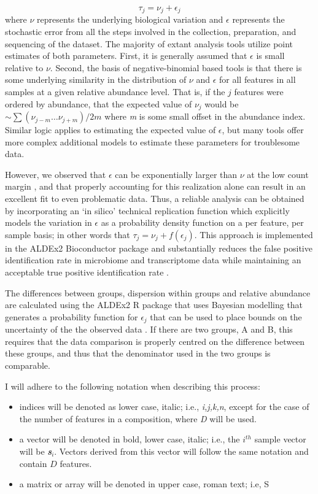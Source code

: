 \documentclass{bmcart}
\begin{document}
\begin{equation}
    \tau_{j} = \nu_j + \epsilon_j
\label{eq:dispersion}
\end{equation} 
where $\nu$ represents the underlying biological variation and $\epsilon$ represents the stochastic error  from all the steps involved in the collection, preparation, and sequencing of the dataset. The majority of extant analysis tools utilize point estimates of both parameters. First, it is generally assumed that  $\epsilon$ is small relative to $\nu$.  Second, the basis of negative-binomial based tools is that there is some underlying similarity in the distribution of $\nu$ and $\epsilon$  for all features in all samples at a given relative abundance level. That is, if the $j$ features were ordered by abundance, that the expected value of $\nu_j$ would be  $\sim \sum (\nu_{j-m}\ldots \nu_{j+m}) / 2m $ where \textit{m} is some small offset in the abundance index. Similar logic applies to estimating the expected value of $\epsilon$, but many tools offer  more complex additional models to estimate these parameters for troublesome data. 

However, we  observed that $\epsilon$ can be exponentially larger than $\nu$ at the low count margin \cite{fernandes:2013,gloorAJS:2016}, and that properly accounting for this realization alone can result in an excellent fit to even problematic data. Thus, a reliable analysis can be obtained by incorporating an `in silico' technical replication function which explicitly models the variation in $\epsilon$ as a probability density function on a per feature, per sample basis; in other words that $\tau_{j} = \nu_j + f(\epsilon_{j})$. This approach is implemented in the ALDEx2 Bioconductor package and substantially reduces the false positive identification rate in microbiome and transcriptome data while maintaining an acceptable true positive identification rate \cite{fernandes:2013,Thorsen:2016aa}.

The differences between groups, dispersion within groups and relative abundance are calculated using the ALDEx2 R package that uses Bayesian modelling that generates a probability function for  $\epsilon_j$ that can be used to place bounds on the uncertainty of the the observed data \cite{fernandes:2013,gloorAJS:2016}. If there are two groups, A and B,  this requires that the data comparison is properly centred on the difference between these groups, and thus that the denominator used in the two groups is comparable.  

I will adhere to the following notation when describing this process:
\begin{itemize}
\item{indices} will be denoted as lower case, italic; i.e., \textit{i,j,k,n}, except for the case of the number of features in a composition, where \textit{D} will be used.
\item{a vector} will be denoted in bold, lower case, italic; i.e., the $i^{th}$ sample vector will be \textit{\textbf{s$_i$}}. Vectors derived from this vector will follow the same notation and contain $D$ features.
\item{a matrix or array} will be denoted in upper case, roman text; i.e, S
\end{itemize}
\end{document}
